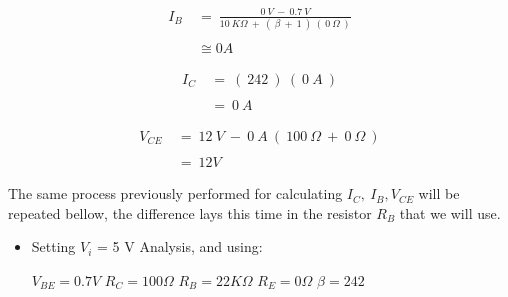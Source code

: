 \begin{ceqn}
\begin{align}
I_{B}\ &=\ \frac{0\ V\ -\ 0.7\ V}{10\ K\Omega\ +\ (\ \beta\ +\ 1\ )\ (\ 0\ \Omega\ )} \\ \\
&\cong 0 A
\end{align}
\end{ceqn} \hfill \break

{\bfseries\itshape{}} 

\begin{flushright}
{\bfseries\itshape{}} \hfill \break
\end{flushright}

\begin{ceqn}
\begin{align}
I_{C}\ &=\ (\ 242\ )\ (\ 0\ A\ ) \\ \\
&=\ 0\ A
\end{align}
\end{ceqn} \hfill \break

{\bfseries\itshape{}} 

\begin{flushright}
{\bfseries\itshape{}} \hfill \break
\end{flushright}

\begin{ceqn}
\begin{align}
V_{CE}\ &=\ 12\ V\ -\ 0\ A\ (\ 100\ \Omega\ +\ 0\ \Omega\ ) \\ \\
&=\ 12 V
\end{align}
\end{ceqn} \hfill \break

\pagebreak

The same process previously performed for calculating $I_{C},\ I_{B}, V_{CE}$ will be repeated bellow, the difference lays this time in the resistor $R_{B}$ that we will use. \hfill \break

{\bfseries\itshape
\begin{itemize}
\item Setting $V_{i}$ = 5 V Analysis, and using:
\begin{tasks}
\task $V_{BE} =  0.7 V$
\task $R_{C} = 100 \Omega$ 
\task $R_{B} = 22K \Omega$ 
\task $R_{E} = 0 \Omega$ 
\task $\beta = 242$ 
\end{tasks}
\end{itemize}} \hfill \break


